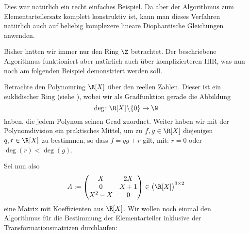 Dies war natürlich ein recht einfaches Beispiel. Da aber der Algorithmus zum
Elementarteilersatz komplett konstruktiv ist, kann man dieses Verfahren
natürlich auch auf beliebig komplexere lineare Diophantische Gleichungen
anwenden.

Bisher hatten wir immer nur den Ring $\Z$ betrachtet. Der beschriebene
Algorithmus funktioniert aber natürlich auch über komplizierteren HIR, was nun
noch am folgenden Beispiel demonstriert werden soll.

\begin{thBeisp}\label{bsp:polyring}
    Betrachte den Polynomring $\R[X]$ über den reellen Zahlen. Dieser ist ein
    euklidischer Ring (siehe \cite[Kor.~5]{talk:rief}), %
    wobei wir als Gradfunktion gerade die Abbildung \vspace*{-7pt}
    \[ \deg\colon\R[X]\!\setminus\!\{0\}\to\N       \vspace*{-7pt}   \] 
    haben, die jedem Polynom seinen Grad zuordnet. Weiter haben wir mit der
    Polynomdivision ein praktisches Mittel, um zu $f,g\in\R[X]$ diejenigen
    $q,r\in\R[X]$ zu bestimmen, so dass $f = qg+r$ gilt, mit: $r=0$ oder
    $\deg(r)<\deg(g)$.
    
    Sei nun also
    \[ A := \Matrix{ X      &  2X   \\
                     0      &  X+1  \\
                     X^2-X  &  0     }  
    \in \bigl(\R[X]\bigr)^{3\times2}
    \]
    eine Matrix mit Koeffizienten aus $\R[X]$. Wir wollen noch einmal den
    Algorithmus für die Bestimmung der Elementarteiler inklusive der
    Transformationsmatrizen durchlaufen:
    

\end{thBeisp}
